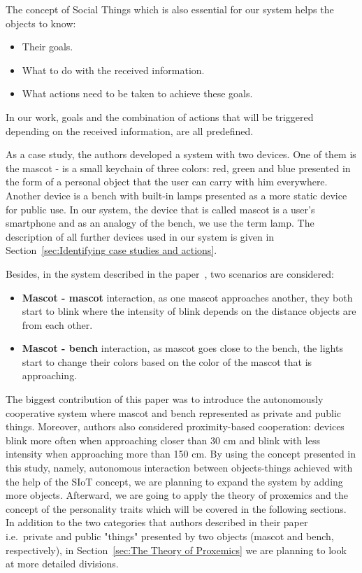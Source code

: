 The concept of Social Things which is also essential for our system helps the objects to know:
\begin{itemize}
    \item Their goals.
    \item What to do with the received information.
    \item What actions need to be taken to achieve these goals.
\end{itemize}
In our work, goals and the combination of actions that will be triggered
depending on the received information, are all predefined.

As a case study, the authors developed a system with two devices.
One of them is the mascot - is a small keychain of three colors:
red, green and blue presented in the form of a personal object that the user can carry with him everywhere.
Another device is a bench with built-in lamps presented as a more static device for public use.
In our system, the device that is called mascot is a user's smartphone and as an
analogy of the bench, we use the term lamp.
The description of all further devices used in our system is given
in Section~\ref{sec:Identifying case studies and actions}.

Besides, in the system described in the paper~\cite{okada2016autonomous}, two scenarios are considered:
\begin{itemize}
  \item \textbf{Mascot - mascot} interaction, as one mascot approaches another, they both start to blink where the
        intensity of blink depends on the distance objects are from each other.
  \item \textbf{Mascot - bench} interaction, as mascot goes close to the bench, the lights
        start to change their colors based on the color of the mascot that is approaching.
\end{itemize}

The biggest contribution of this paper was to introduce the autonomously cooperative
system where mascot and bench represented as private and public things.
Moreover, authors also considered proximity-based cooperation: devices blink more often when
approaching closer than 30 cm and blink with less intensity when approaching more than 150 cm.
By using the concept presented in this study, namely, autonomous interaction between objects-things
achieved with the help of the SIoT concept, we are planning to expand the system by adding more objects.
Afterward, we are going to apply the theory of proxemics and the concept of the personality
traits which will be covered in the following sections.
In addition to the two categories that authors described in their paper i.e.\ private and public "things"
presented by two objects (mascot and bench, respectively), in Section~\ref{sec:The Theory of Proxemics}
we are planning to look at more detailed divisions.

